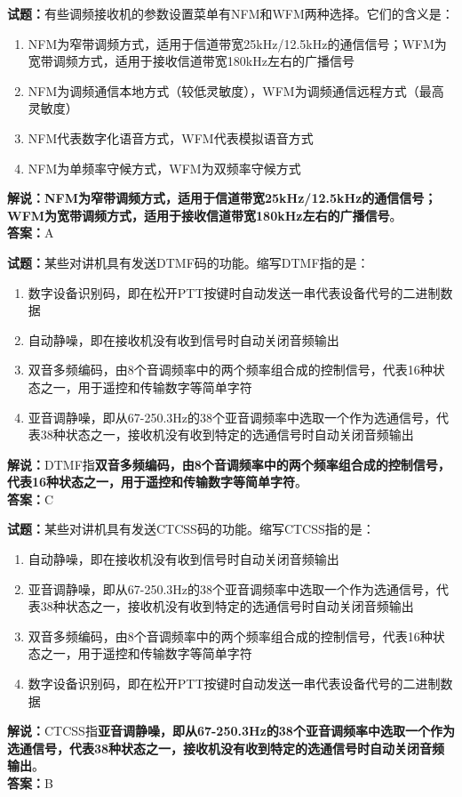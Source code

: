 \documentclass{ctexbook}
\begin{document}
\bigskip


\noindent\textbf{试题：}有些调频接收机的参数设置菜单有NFM和WFM两种选择。它们的含义是：
\begin{enumerate}[leftmargin=3em]
\item NFM为窄带调频方式，适用于信道带宽25kHz/12.5kHz的通信信号；WFM为宽带调频方式，适用于接收信道带宽180kHz左右的广播信号
\item NFM为调频通信本地方式（较低灵敏度），WFM为调频通信远程方式（最高灵敏度）
\item NFM代表数字化语音方式，WFM代表模拟语音方式
\item NFM为单频率守候方式，WFM为双频率守候方式
\end{enumerate}
\noindent\textbf{解说：NFM为窄带调频方式，适用于信道带宽25kHz/12.5kHz的通信信号；WFM为宽带调频方式，适用于接收信道带宽180kHz左右的广播信号}。\\\noindent\textbf{答案：}A



\bigskip


\noindent\textbf{试题：}某些对讲机具有发送DTMF码的功能。缩写DTMF指的是：
\begin{enumerate}[leftmargin=3em]
\item 数字设备识别码，即在松开PTT按键时自动发送一串代表设备代号的二进制数据
\item 自动静噪，即在接收机没有收到信号时自动关闭音频输出
\item 双音多频编码，由8个音调频率中的两个频率组合成的控制信号，代表16种状态之一，用于遥控和传输数字等简单字符
\item 亚音调静噪，即从67-250.3Hz的38个亚音调频率中选取一个作为选通信号，代表38种状态之一，接收机没有收到特定的选通信号时自动关闭音频输出
\end{enumerate}
\noindent\textbf{解说：}DTMF指\textbf{双音多频编码，由8个音调频率中的两个频率组合成的控制信号，代表16种状态之一，用于遥控和传输数字等简单字符}。\\\noindent\textbf{答案：}C



\bigskip


\noindent\textbf{试题：}某些对讲机具有发送CTCSS码的功能。缩写CTCSS指的是：
\begin{enumerate}[leftmargin=3em]
\item 自动静噪，即在接收机没有收到信号时自动关闭音频输出
\item 亚音调静噪，即从67-250.3Hz的38个亚音调频率中选取一个作为选通信号，代表38种状态之一，接收机没有收到特定的选通信号时自动关闭音频输出
\item 双音多频编码，由8个音调频率中的两个频率组合成的控制信号，代表16种状态之一，用于遥控和传输数字等简单字符
\item 数字设备识别码，即在松开PTT按键时自动发送一串代表设备代号的二进制数据
\end{enumerate}
\noindent\textbf{解说：}CTCSS指\textbf{亚音调静噪，即从67-250.3Hz的38个亚音调频率中选取一个作为选通信号，代表38种状态之一，接收机没有收到特定的选通信号时自动关闭音频输出}。\\\noindent\textbf{答案：}B
\end{document}
